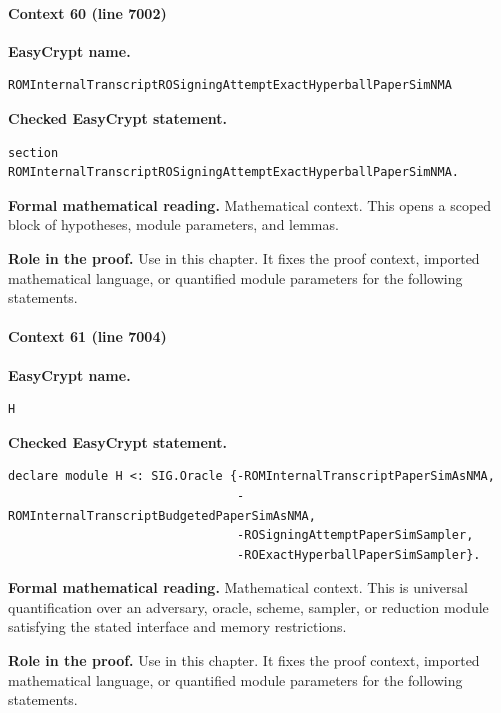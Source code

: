 \paragraph{Context 60 (line 7002)}
\noindent\textbf{EasyCrypt name.}
\begin{lstlisting}[language=EasyCrypt,basicstyle=\ttfamily\scriptsize]
ROMInternalTranscriptROSigningAttemptExactHyperballPaperSimNMA
\end{lstlisting}
\noindent\textbf{Checked EasyCrypt statement.}
\begin{lstlisting}[language=EasyCrypt,basicstyle=\ttfamily\scriptsize]
section ROMInternalTranscriptROSigningAttemptExactHyperballPaperSimNMA.
\end{lstlisting}
\noindent\textbf{Formal mathematical reading.}
Mathematical context. This opens a scoped block of hypotheses, module parameters, and lemmas.

\noindent\textbf{Role in the proof.}
Use in this chapter. It fixes the proof context, imported mathematical language, or quantified module parameters for the following statements.

\paragraph{Context 61 (line 7004)}
\noindent\textbf{EasyCrypt name.}
\begin{lstlisting}[language=EasyCrypt,basicstyle=\ttfamily\scriptsize]
H
\end{lstlisting}
\noindent\textbf{Checked EasyCrypt statement.}
\begin{lstlisting}[language=EasyCrypt,basicstyle=\ttfamily\scriptsize]
declare module H <: SIG.Oracle {-ROMInternalTranscriptPaperSimAsNMA,
                                -ROMInternalTranscriptBudgetedPaperSimAsNMA,
                                -ROSigningAttemptPaperSimSampler,
                                -ROExactHyperballPaperSimSampler}.
\end{lstlisting}
\noindent\textbf{Formal mathematical reading.}
Mathematical context. This is universal quantification over an adversary, oracle, scheme, sampler, or reduction module satisfying the stated interface and memory restrictions.

\noindent\textbf{Role in the proof.}
Use in this chapter. It fixes the proof context, imported mathematical language, or quantified module parameters for the following statements.

